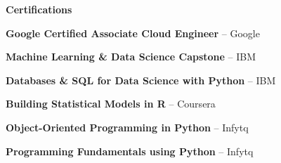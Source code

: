 \documentclass[
]{article}
\newcommand{\cvsection}[1]{\textbf{#1}}
\begin{document}
\begin{center}\cvsection{Certifications}\end{center}
\vspace{-0.5em}

\begin{minipage}[t]{0.48\textwidth}
\textbf{Google Certified Associate Cloud Engineer} -- Google
\vspace{0.1em}

\textbf{Machine Learning \& Data Science Capstone} -- IBM
\vspace{0.1em}

\textbf{Databases \& SQL for Data Science with Python} -- IBM
\end{minipage}
\hfill
\begin{minipage}[t]{0.48\textwidth}
\textbf{Building Statistical Models in R} -- Coursera
\vspace{0.1em}

\textbf{Object-Oriented Programming in Python} -- Infytq
\vspace{0.1em}

\textbf{Programming Fundamentals using Python} -- Infytq
\end{minipage}
\end{document}
